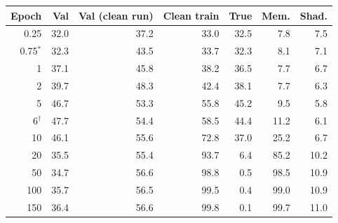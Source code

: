 \begin{tabular}{@{}rrrrrrr@{}}
\toprule
Epoch & Val & Val (clean run) & Clean train & True & Mem. & Shad. \\
\midrule
0.25 & 32.0 & 37.2 & 33.0 & 32.5 & 7.8 & 7.5 \\
0.75$^\ast$ & 32.3 & 43.5 & 33.7 & 32.3 & 8.1 & 7.1 \\
1 & 37.1 & 45.8 & 38.2 & 36.5 & 7.7 & 6.7 \\
2 & 39.7 & 48.3 & 42.4 & 38.1 & 7.7 & 6.3 \\
5 & 46.7 & 53.3 & 55.8 & 45.2 & 9.5 & 5.8 \\
6$^\dagger$ & 47.7 & 54.4 & 58.5 & 44.4 & 11.2 & 6.1 \\
10 & 46.1 & 55.6 & 72.8 & 37.0 & 25.2 & 6.7 \\
20 & 35.5 & 55.4 & 93.7 & 6.4 & 85.2 & 10.2 \\
50 & 34.7 & 56.6 & 98.8 & 0.5 & 98.5 & 10.9 \\
100 & 35.7 & 56.5 & 99.5 & 0.4 & 99.0 & 10.9 \\
150 & 36.4 & 56.6 & 99.8 & 0.1 & 99.7 & 11.0 \\
\bottomrule
\end{tabular}
